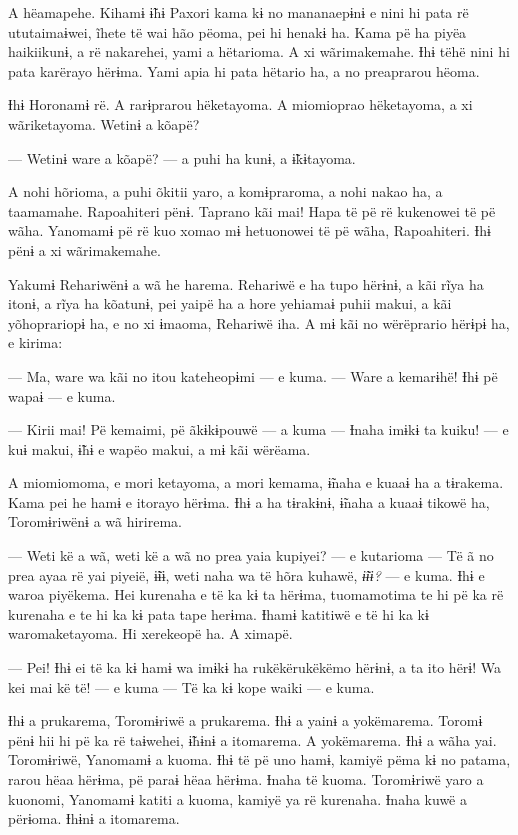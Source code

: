 A hëamapehe. Kihamɨ ɨ̃hɨ Paxori kama kɨ no mananaepɨnɨ e nini hi pata rë
ututaimaɨwei, ĩhete të wai hão pëoma, pei hi henakɨ ha. Kama pë ha piyëa
haikiikunɨ, a rë nakarehei, yami a hëtarioma. A xi wãrimakemahe. Ɨhɨ
tëhë nini hi pata karërayo hërɨma. Yami apia hi pata hëtario ha, a no
preaprarou hëoma. 

Ɨhɨ Horonamɨ rë. A rarɨprarou hëketayoma. A miomioprao hëketayoma, a xi
wãriketayoma. Wetinɨ a kõapë? 

--- Wetinɨ ware a kõapë? --- a puhi ha kunɨ, a ɨ̃kɨtayoma. 

A nohi hõrioma, a puhi õkitii yaro, a komɨpraroma, a nohi nakao ha, a
taamamahe. Rapoahiteri pënɨ. Taprano kãi mai! Hapa të pë rë kukenowei të
pë wãha. Yanomamɨ pë rë kuo xomao mɨ hetuonowei të pë wãha, Rapoahiteri.
Ɨhɨ pënɨ a xi wãrimakemahe. 

Yakumɨ Rehariwënɨ a wã he harema. Rehariwë e ha tupo hërɨnɨ, a kãi rĩya
ha itonɨ, a rĩya ha kõatunɨ, pei yaipë ha a hore yehiamaɨ puhii makui, a
kãi yõhoprariopɨ ha, e no xi ɨmaoma, Rehariwë iha. A mɨ kãi no
wërëprario hërɨpɨ ha, e kirima:

--- Ma, ware wa kãi no itou kateheopɨmi --- e kuma. --- Ware a kemarɨhë!
Ɨhɨ pë wapaɨ --- e kuma. 

--- Kirii mai! Pë kemaimi, pë ãkɨkɨpouwë --- a kuma --- Ɨnaha imɨkɨ ta
kuiku! --- e kuɨ makui, ɨ̃hɨ e wapëo makui, a mɨ kãi wërëama. 

A miomiomoma, e mori ketayoma, a mori kemama, ɨ̃naha e kuaaɨ ha a
tɨrakema. Kama pei he hamɨ e itorayo hërɨma. Ɨhɨ a ha tɨrakɨnɨ, ɨ̃naha a
kuaaɨ tikowë ha, Toromɨriwënɨ a wã hirirema. 

--- Weti kë a wã, weti kë a wã no prea yaia kupiyei? --- e kutarioma --- Të
ã no prea ayaa rë yai piyeië, ɨ̃ɨɨ, weti naha wa të hõra kuhawë, \textit{ɨ̃ɨɨ?} ---
e kuma. Ɨhɨ e waroa piyëkema. Hei kurenaha e të ka kɨ ta hërɨma,
tuomamotima te hi pë ka rë kurenaha e te hi ka kɨ pata tape herɨma.
Ɨhamɨ katitiwë e të hi ka kɨ waromaketayoma. Hi xerekeopë ha. A ximapë. 

--- Pei! Ɨhɨ ei të ka kɨ hamɨ wa imɨkɨ ha rukëkërukëkëmo hërɨnɨ, a ta ito
hërɨ! Wa kei mai kë të! --- e kuma --- Të ka kɨ kope waiki --- e kuma. 

Ɨhɨ a prukarema, Toromɨriwë a prukarema. Ɨhɨ a yainɨ a yokëmarema.
Toromɨ pënɨ hii hi pë ka rë taɨwehei, ɨ̃hɨnɨ a itomarema. A yokëmarema.
Ɨhɨ a wãha yai. Toromɨriwë, Yanomamɨ a kuoma. Ɨhɨ të pë uno hamɨ, kamiyë
pëma kɨ no patama, rarou hëaa hërɨma, pë paraɨ hëaa hërɨma. Ɨnaha të
kuoma. Toromɨriwë yaro a kuonomi, Yanomamɨ katiti a kuoma, kamiyë ya rë
kurenaha. Ɨnaha kuwë a përɨoma. Ɨhɨnɨ a itomarema.

